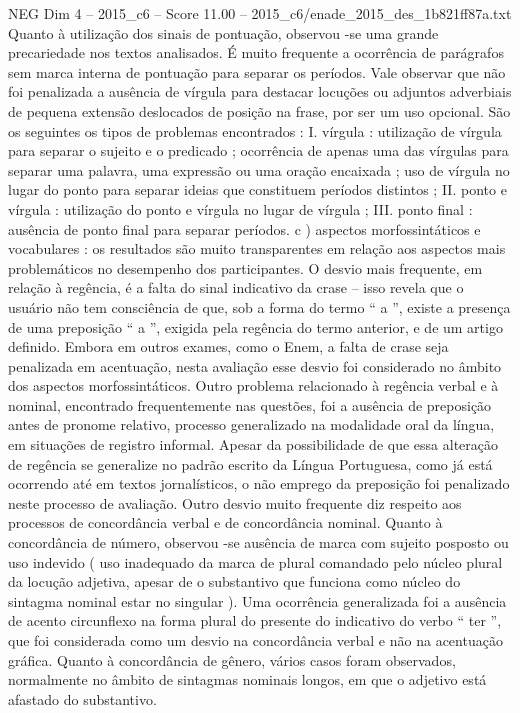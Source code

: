 \begin{textsample}{NEG Dim 4 – 2015\_c6 – Score 11.00 – 2015\_c6/enade\_2015\_des\_1b821ff87a.txt}
Quanto à utilização dos sinais de pontuação, observou -se uma grande precariedade nos textos analisados.
É muito frequente a ocorrência de parágrafos sem marca interna de pontuação para separar os períodos.
Vale observar que não foi penalizada a ausência de vírgula para destacar locuções ou adjuntos adverbiais de pequena extensão deslocados de posição na frase, por ser um uso opcional.
São os seguintes os tipos de problemas encontrados : I. vírgula : utilização de vírgula para separar o sujeito e o predicado ; ocorrência de apenas uma das vírgulas para separar uma palavra, uma expressão ou uma oração encaixada ; uso de vírgula no lugar do ponto para separar ideias que constituem períodos distintos ; II. ponto e vírgula : utilização do ponto e vírgula no lugar de vírgula ; III. ponto final : ausência de ponto final para separar períodos. c ) aspectos morfossintáticos e vocabulares : os resultados são muito transparentes em relação aos aspectos mais problemáticos no desempenho dos participantes.
O desvio mais frequente, em relação à regência, é a falta do sinal indicativo da crase – isso revela que o usuário não tem consciência de que, sob a forma do termo “ a ”, existe a presença de uma preposição “ a ”, exigida pela regência do termo anterior, e de um artigo definido.
Embora em outros exames, como o Enem, a falta de crase seja penalizada em acentuação, nesta avaliação esse desvio foi considerado no âmbito dos aspectos morfossintáticos.
Outro problema relacionado à regência verbal e à nominal, encontrado frequentemente nas questões, foi a ausência de preposição antes de pronome relativo, processo generalizado na modalidade oral da língua, em situações de registro informal.
Apesar da possibilidade de que essa alteração de regência se generalize no padrão escrito da Língua Portuguesa, como já está ocorrendo até em textos jornalísticos, o não emprego da preposição foi penalizado neste processo de avaliação.
Outro desvio muito frequente diz respeito aos processos de concordância verbal e de concordância nominal.
Quanto à concordância de número, observou -se ausência de marca com sujeito posposto ou uso indevido ( uso inadequado da marca de plural comandado pelo núcleo plural da locução adjetiva, apesar de o substantivo que funciona como núcleo do sintagma nominal estar no singular ).
Uma ocorrência generalizada foi a ausência de acento circunflexo na forma plural do presente do indicativo do verbo “ ter ”, que foi considerada como um desvio na concordância verbal e não na acentuação gráfica.
Quanto à concordância de gênero, vários casos foram observados, normalmente no âmbito de sintagmas nominais longos, em que o adjetivo está afastado do substantivo.

\end{textsample}
